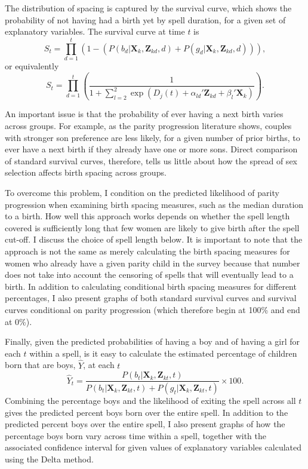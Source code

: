 \documentclass[12pt,letterpaper]{article}
\begin{document}
The distribution of spacing is captured by the survival curve, which shows 
the probability of not having had a birth yet by spell duration, for
a given set of explanatory variables.
The survival curve at time $t$ is 
\begin{equation}
S_{t} 
= 
\prod_{d=1}^t 
\left( 
	1- \left(P(b_{d} | \mathbf{X}_{k}, \mathbf{Z}_{kd}, d) 
	+ P(g_{d} | \mathbf{X}_{k}, \mathbf{Z}_{kd}, d) \right) 
\right),
 \label{eq:survival}
\end{equation}
or equivalently
\begin{equation}
S_{t} 
= 
\prod_{d=1}^t
\left(
\frac{ 1 }
{1 + \sum_{l=2}^2 \exp(D_j(t) + \alpha_{ld}'\mathbf{Z}_{kd} + \beta_l'\mathbf{X}_{k})}
\right).
\end{equation}

An important issue is that the probability of ever having a next birth varies 
across groups.
For example, as the parity progression literature shows, couples with stronger 
son preference are less likely, for a given number of prior births, to ever have 
a next birth if they already have one or more sons.
Direct comparison of standard survival curves, therefore, tells us little 
about how the spread of sex selection affects birth spacing across groups.


To overcome this problem, I condition on the predicted likelihood of parity 
progression when examining birth spacing measures, such as the median duration 
to a birth.
How well this approach works depends on whether the spell length covered is 
sufficiently long that few women are likely to give birth after the spell cut-off.
I discuss the choice of spell length below.
It is important to note that the approach is not the same as merely calculating 
the birth spacing measures for women who already have a given 
parity child in the survey because that number does not take into account
the censoring of spells that will eventually lead to a birth.
In addition to calculating conditional birth spacing measures for different 
percentages, I also present graphs of both standard survival curves and
survival curves conditional on parity progression (which therefore
begin at 100\% and end at 0\%).


Finally, given the predicted probabilities of having a boy and of having 
a girl for each $t$ within a spell, is it easy to calculate the estimated 
percentage of children born that are boys, $\hat{Y}$, at each $t$  
\begin{equation}
\hat{Y}_t 
= 
\frac{ P(b_{t} | \mathbf{X}_{k}, \mathbf{Z}_{kt},t )}
{ P(b_{t} | \mathbf{X}_{k}, \mathbf{Z}_{kt},t) + P(g_{t} | \mathbf{X}_{k}, \mathbf{Z}_{kt},t )} 
\times 100.
\label{eq:probability_son}
\end{equation}
Combining the percentage boys and the likelihood of exiting the spell 
across all $t$ gives the predicted percent boys born over the entire spell.
In addition to the predicted percent boys over the entire spell, 
I also present graphs of how the percentage boys born vary across time
within a spell, together with the associated confidence interval for given 
values of explanatory variables calculated using the Delta method.
\end{document}
